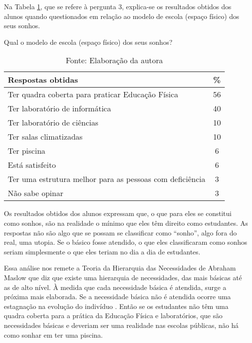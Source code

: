 \begin{refsection}
    Na Tabela \ref{tble:poll-results}, que se refere à pergunta 3, explica-se os resultados obtidos dos alunos quando questionados em relação ao modelo de escola (espaço físico) dos seus sonhos.

    \begin{table}
        \centering
        \caption{Qual o modelo de escola (espaço físico) dos seus sonhos?}
        \label{tble:poll-results}

        \begin{tabular}{l c}
        \toprule
        Respostas obtidas                                          & \% \\
        \midrule
        Ter quadra coberta para praticar Educação Física           & 56 \\
        Ter laboratório de informática                             & 40 \\
        Ter laboratório de ciências                                & 10 \\
        Ter salas climatizadas                                     & 10 \\
        Ter piscina                                                &  6 \\
        Está satisfeito                                            &  6 \\
        Ter uma estrutura melhor para as pessoas com deficiência   &  3 \\
        Não sabe opinar                                            &  3 \\
        \bottomrule
        \end{tabular}

        \caption*{Fonte: Elaboração da autora}
    \end{table}

    Os resultados obtidos dos alunos expressam que, o que para eles se constitui como sonhos, são na realidade o mínimo que eles têm direito como estudantes. As respostas não são algo que se possam se classificar como “sonho”, algo fora do real, uma utopia. Se o básico fosse atendido, o que eles classificaram como sonhos seriam simplesmente o que eles teriam no dia a dia de estudantes.  

    Essa análise nos remete a Teoria da Hierarquia das Necessidades de Abraham Maslow que diz que existe uma hierarquia de necessidades, das mais básicas até as de alto nível.  À medida que cada necessidade básica é atendida, surge a próxima mais elaborada. Se a necessidade básica não é atendida ocorre uma estagnação na evolução do indivíduo \cite{CAMARGO2012Psicologia}. Então se os estudantes não têm uma quadra coberta para a prática da Educação Física e laboratórios, que são necessidades básicas e deveriam ser uma realidade nas escolas públicas, não há como sonhar em ter uma piscina. 



\end{refsection}
